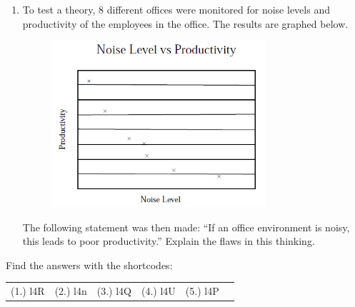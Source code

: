 \begin{description}[noitemsep]
\begin{description}[noitemsep]
\begin{enumerate}[noitemsep, label=\textbf{\arabic*}. ]
\begin{figure}[H]
\begin{center}
      \vspace{2pt}
    \vspace{.1in}
    \end{center}
 \end{figure}               \label{m39404*uid121}\item To test a theory, 8 different offices were monitored for noise levels and productivity of the employees in the office. The results are graphed below.
    \setcounter{subfigure}{0}
	\begin{figure}[H] %
    \begin{center}
    \label{m39404*id216374!!!underscore!!!media}\label{m39404*id216374!!!underscore!!!printimage}\includegraphics[width=300px]{col11306.imgs/m39404_MG10C16_015.png} %
      \vspace{2pt}
    \vspace{.1in}
    \end{center}
 \end{figure}       
The following statement was then made:
``If an office environment is noisy, this leads to poor productivity.''
Explain the flaws in this thinking.\newline
\end{enumerate}
\label{m39404*cid9}
\par {} Find the answers with the shortcodes:
 \par \begin{tabular}[h]{cccccc}
 (1.) l4R  &  (2.) l4n  &  (3.) l4Q  &  (4.) l4U  &  (5.) l4P  & \end{tabular}

\end{description}
\end{description}
